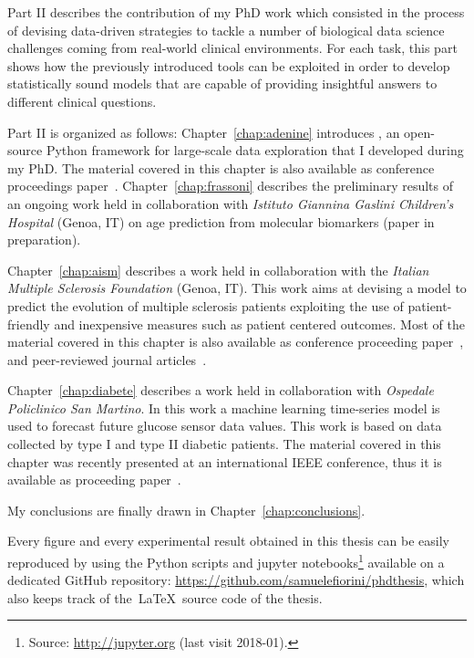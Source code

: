 Part II describes the contribution of my PhD work which consisted in the process of devising data-driven strategies to tackle a number of biological data science challenges coming from real-world clinical environments. For each task, this part shows how the previously introduced tools can be exploited in order to develop statistically sound models that are capable of providing insightful answers to different clinical questions.

Part II is organized as follows:
Chapter~\ref{chap:adenine} introduces \ade, an open-source Python framework for large-scale data exploration that I developed during my PhD.
The material covered in this chapter is also available as conference proceedings paper~\cite{fiorini2017adenine}.
Chapter~\ref{chap:frassoni} describes the preliminary results of an ongoing work held in collaboration with \textit{Istituto Giannina Gaslini Children's Hospital} (Genoa, IT) on age prediction from molecular biomarkers (paper in preparation).

Chapter~\ref{chap:aism} describes a work held in collaboration with the \textit{Italian Multiple Sclerosis Foundation} (Genoa, IT). This work aims at devising a model to predict the evolution of multiple sclerosis patients exploiting the use of patient-friendly and inexpensive measures such as patient centered outcomes.
Most of the material covered in this chapter is also available as conference proceeding paper~\cite{fiorini2015machine}, and peer-reviewed journal articles~\cite{brichetto2015improving, fiorini2016temporal, brichetto2016predicting, pmlr-v68-fiorini17a, tacchino2017multiple}.

Chapter~\ref{chap:diabete} describes a work held in collaboration with \textit{Ospedale Policlinico San Martino}. In this work a machine learning time-series model is used to forecast future glucose sensor data values. This work is based on data collected by type I and type II diabetic patients.
The material covered in this chapter was recently presented at an international IEEE conference, thus it is available as proceeding paper~\cite{fiorini2017data}.

My conclusions are finally drawn in Chapter~\ref{chap:conclusions}.

Every figure and every experimental result obtained in this thesis can be easily reproduced by using the Python scripts and {\sc jupyter}  notebooks\footnote{ Source: \url{http://jupyter.org} (last visit 2018-01).} available on a dedicated GitHub repository: \url{https://github.com/samuelefiorini/phdthesis}, which also keeps track of the~\LaTeX~source code of the thesis.

